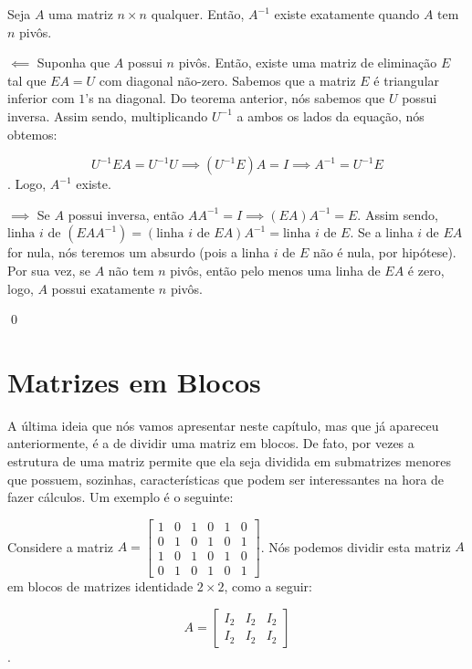 \begin{Proposition}
	Seja $A$ uma matriz $n\times n$ qualquer. Então, $A^{-1}$ existe exatamente quando $A$ tem $n$ pivôs.
\end{Proposition}

\begin{Proof}
	$\impliedby$ Suponha que $A$ possui $n$ pivôs. Então, existe uma matriz de eliminação $E$ tal que $EA = U$ com diagonal não-zero. Sabemos que a matriz $E$ é triangular inferior com $1$'s na diagonal. Do teorema anterior, nós sabemos que $U$ possui inversa. Assim sendo, multiplicando $U^{-1}$ a ambos os lados da equação, nós obtemos:
	
	$$
	U^{-1}EA = U^{-1}U \implies (U^{-1}E)A = I \implies A^{-1} = U^{-1}E
	$$.
	Logo, $A^{-1}$ existe.
	
	$\implies$ Se $A$ possui inversa, então $AA^{-1} = I \implies (EA)A^{-1} = E$. Assim sendo, $\text{linha $i$ de $(EAA^{-1})$} = (\text{linha $i$ de $EA$})A^{-1} = \text{linha $i$ de $E$}$. Se a linha $i$ de $EA$ for nula, nós teremos um absurdo (pois a linha $i$ de $E$ não é nula, por hipótese). Por sua vez, se $A$ não tem $n$ pivôs, então pelo menos uma linha de $EA$ é zero, logo, $A$ possui exatamente $n$ pivôs.
	
	\qed
\end{Proof}

\section{Matrizes em Blocos}

A última ideia que nós vamos apresentar neste capítulo, mas que já apareceu anteriormente, é a de dividir uma matriz em blocos. De fato, por vezes a estrutura de uma matriz permite que ela seja dividida em submatrizes menores que possuem, sozinhas, características que podem ser interessantes na hora de fazer cálculos. Um exemplo é o seguinte:

\begin{Example}
	Considere a matriz $A = \begin{bmatrix}
		1 & 0 & 1 & 0 & 1 & 0 \\
		0 & 1 & 0 & 1 & 0 & 1 \\
		1 & 0 & 1 & 0 & 1 & 0 \\
		0 & 1 & 0 & 1 & 0 & 1
	\end{bmatrix}$. Nós podemos dividir esta matriz $A$ em blocos de matrizes identidade $2\times 2$, como a seguir:
	
	$$
	A = \begin{bmatrix}
		I_2 & I_2 & I_2 \\
		I_2 & I_2 & I_2
	\end{bmatrix}
	$$.
\end{Example}

